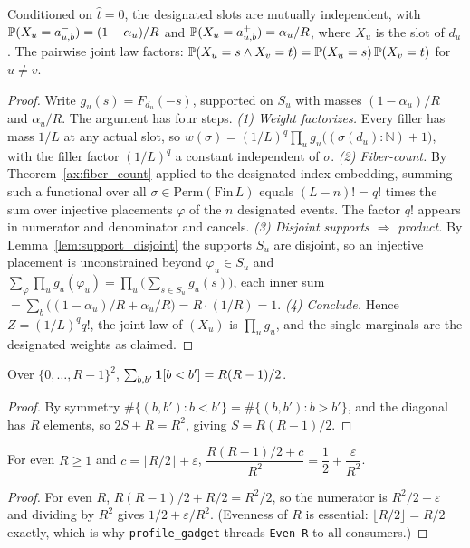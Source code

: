 \begin{lemma}
\label{lem:independence_fillers}
\leanok
{}
Conditioned on $\hat t = 0$, the designated slots are mutually independent, with
$\mathbb{P}(X_u = a^-_{u,b}) = (1-\alpha_u)/R$ and
$\mathbb{P}(X_u = a^+_{u,b}) = \alpha_u/R$, where $X_u$ is the slot of $d_u$. The
pairwise joint law factors:
$\mathbb{P}(X_u = s \wedge X_v = t) = \mathbb{P}(X_u=s)\,\mathbb{P}(X_v=t)$ for $u \ne v$.
\end{lemma}
\begin{proof}
\leanok
{}
Write $g_u(s) = F_{d_u}(-s)$, supported on $S_u$ with masses $(1-\alpha_u)/R$ and
$\alpha_u/R$. The argument has four steps.
\emph{(1) Weight factorizes.} Every filler has mass $1/L$ at any actual slot, so
$w(\sigma) = (1/L)^q \prod_{u} g_u\big((\sigma(d_u):\mathbb N)+1\big)$, with the
filler factor $(1/L)^q$ a constant independent of $\sigma$.
\emph{(2) Fiber-count.} By Theorem~\ref{ax:fiber_count} applied to the
designated-index embedding, summing such a functional over all
$\sigma \in \mathrm{Perm}(\mathrm{Fin}\,L)$ equals $(L-n)! = q!$ times the sum
over injective placements $\varphi$ of the $n$ designated events. The factor $q!$
appears in numerator and denominator and cancels.
\emph{(3) Disjoint supports $\Rightarrow$ product.} By
Lemma~\ref{lem:support_disjoint} the supports $S_u$ are disjoint, so an injective
placement is unconstrained beyond $\varphi_u \in S_u$ and
$\sum_{\varphi} \prod_u g_u(\varphi_u) = \prod_u \big(\sum_{s \in S_u} g_u(s)\big)$,
each inner sum $= \sum_b\big((1-\alpha_u)/R + \alpha_u/R\big) = R \cdot (1/R) = 1$.
\emph{(4) Conclude.} Hence $Z = (1/L)^q q!$, the joint law of $(X_u)$ is
$\prod_u g_u$, and the single marginals are the designated weights as claimed.
\end{proof}

\begin{lemma}
\label{lem:pair_count_lt}
\leanok
Over $\{0,\dots,R-1\}^2$, $\sum_{b,b'} \mathbf{1}[b<b'] = R(R-1)/2$.
\end{lemma}
\begin{proof}
\leanok
By symmetry $\#\{(b,b') : b<b'\} = \#\{(b,b') : b>b'\}$, and the diagonal has $R$
elements, so $2S + R = R^2$, giving $S = R(R-1)/2$.
\end{proof}

\begin{lemma}
\label{lem:designated_margin_close}
\leanok
For even $R \ge 1$ and $c = \lfloor R/2\rfloor + \varepsilon$,
$\dfrac{R(R-1)/2 + c}{R^2} = \dfrac12 + \dfrac{\varepsilon}{R^2}$.
\end{lemma}
\begin{proof}
\leanok
For even $R$, $R(R-1)/2 + R/2 = R^2/2$, so the numerator is $R^2/2 + \varepsilon$
and dividing by $R^2$ gives $1/2 + \varepsilon/R^2$. (Evenness of $R$ is
essential: $\lfloor R/2\rfloor = R/2$ exactly, which is why
\texttt{profile\_gadget} threads \texttt{Even R} to all consumers.)
\end{proof}

